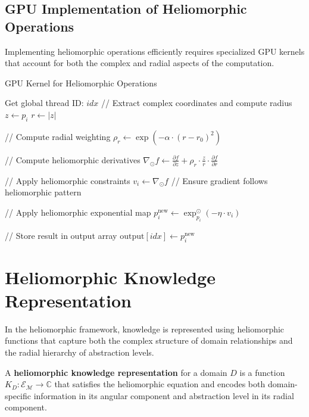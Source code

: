 \subsection{GPU Implementation of Heliomorphic Operations}

Implementing heliomorphic operations efficiently requires specialized GPU kernels that account for both the complex and radial aspects of the computation.

\begin{algorithm}
\caption{GPU Kernel for Heliomorphic Operations}
\begin{algorithmic}[1]
    \State Get global thread ID: $idx$
        \State // Extract complex coordinates and compute radius
        \State $z \gets p_i$
        \State $r \gets |z|$
        
        \State // Compute radial weighting
        \State $\rho_r \gets \exp(-\alpha \cdot (r - r_0)^2)$
        
        \State // Compute heliomorphic derivatives
        \State $\nabla_{\odot} f \gets \frac{\partial f}{\partial z} + \rho_r \cdot \frac{z}{r} \cdot \frac{\partial f}{\partial r}$
        
        \State // Apply heliomorphic constraints
        \State $v_i \gets \nabla_{\odot} f$ // Ensure gradient follows heliomorphic pattern
        
        \State // Apply heliomorphic exponential map
        \State $p_i^{\text{new}} \gets \exp_{p_i}^{\odot}(-\eta \cdot v_i)$
        
        \State // Store result in output array
        \State $\text{output}[idx] \gets p_i^{\text{new}}$
    \EndIf
\EndFunction
\end{algorithmic}
\end{algorithm}

\section{Heliomorphic Knowledge Representation}

In the heliomorphic framework, knowledge is represented using heliomorphic functions that capture both the complex structure of domain relationships and the radial hierarchy of abstraction levels.

\begin{definition}
A \textbf{heliomorphic knowledge representation} for a domain $D$ is a function $K_D: \mathcal{E}_{\mathcal{M}} \rightarrow \mathbb{C}$ that satisfies the heliomorphic equation and encodes both domain-specific information in its angular component and abstraction level in its radial component.
\end{definition}

